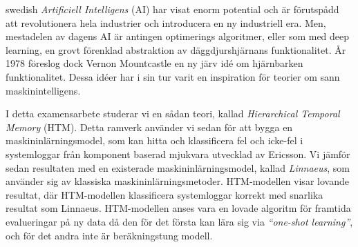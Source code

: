 \begin{foreignabstract}{swedish}
    \textit{Artificiell Intelligens} (AI) har visat enorm potential och är förutspådd att revolutionera hela industrier och introducera en ny industriell era. Men, mestadelen av dagens AI är antingen optimerings algoritmer, eller som med deep learning, en grovt förenklad abstraktion av däggdjurshjärnans funktionalitet. År 1978 föreslog dock Vernon Mountcastle en ny järv idé om hjärnbarken funktionalitet. Dessa idéer har i sin tur varit en inspiration för teorier om sann maskinintelligens. 
    
    I detta examensarbete studerar vi en sådan teori, kallad \textit{Hierarchical Temporal Memory} (HTM). Detta ramverk använder vi sedan för att bygga en maskininlärningsmodel, som kan hitta och klassificera fel och icke-fel i systemloggar från komponent baserad mjukvara utvecklad av Ericsson. Vi jämför sedan resultaten med en existerade maskininlärningsmodel, kallad \textit{Linnaeus}, som använder sig av klassiska maskininlärningsmetoder. HTM-modellen visar lovande resultat, där HTM-modellen klassificera systemloggar korrekt med snarlika resultat som Linnaeus. HTM-modellen anses vara en lovade algoritm för framtida evalueringar på ny data då den för det första kan lära sig via \textit{``one-shot learning''}, och för det andra inte är beräkningstung modell. 
\end{foreignabstract}
\endinput